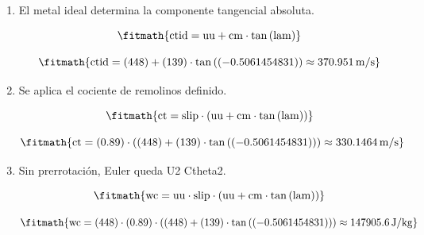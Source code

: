 \begin{enumerate}

\item El metal ideal determina la componente tangencial absoluta.

\[\fitmath{\mathrm{ctid}=\mathrm{uu}+\mathrm{cm}\cdot \tan\left(\mathrm{lam}\right)}\]

\[\fitmath{\mathrm{ctid}=(448)+(139)\cdot \tan\left((-0.5061454831)\right)\approx 370.951\,\mathrm{m/s}}\]

\item Se aplica el cociente de remolinos definido.

\[\fitmath{\mathrm{ct}=\mathrm{slip}\cdot \left(\mathrm{uu}+\mathrm{cm}\cdot \tan\left(\mathrm{lam}\right)\right)}\]

\[\fitmath{\mathrm{ct}=(0.89)\cdot \left((448)+(139)\cdot \tan\left((-0.5061454831)\right)\right)\approx 330.1464\,\mathrm{m/s}}\]

\item Sin prerrotación, Euler queda U2 Ctheta2.

\[\fitmath{\mathrm{wc}=\mathrm{uu}\cdot \mathrm{slip}\cdot \left(\mathrm{uu}+\mathrm{cm}\cdot \tan\left(\mathrm{lam}\right)\right)}\]

\[\fitmath{\mathrm{wc}=(448)\cdot (0.89)\cdot \left((448)+(139)\cdot \tan\left((-0.5061454831)\right)\right)\approx 147905.6\,\mathrm{J/kg}}\]

\end{enumerate}
